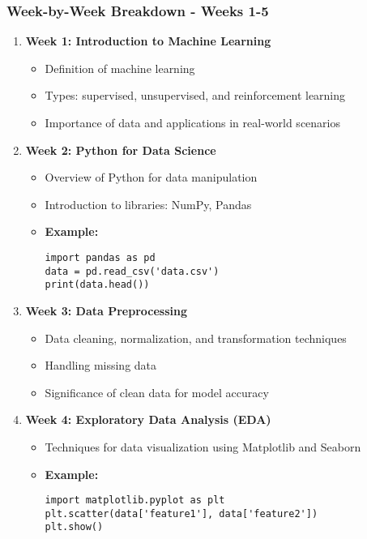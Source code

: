 \documentclass[aspectratio=169]{beamer}
\begin{document}
\begin{frame}
    \frametitle{Week-by-Week Breakdown - Weeks 1-5}
    \begin{enumerate}
        \item \textbf{Week 1: Introduction to Machine Learning}
            \begin{itemize}
                \item Definition of machine learning
                \item Types: supervised, unsupervised, and reinforcement learning
                \item Importance of data and applications in real-world scenarios
            \end{itemize}

        \item \textbf{Week 2: Python for Data Science}
            \begin{itemize}
                \item Overview of Python for data manipulation
                \item Introduction to libraries: NumPy, Pandas
                \item \textbf{Example:}
                \begin{lstlisting}
import pandas as pd
data = pd.read_csv('data.csv')
print(data.head())
                \end{lstlisting}
            \end{itemize}

        \item \textbf{Week 3: Data Preprocessing}
            \begin{itemize}
                \item Data cleaning, normalization, and transformation techniques
                \item Handling missing data
                \item Significance of clean data for model accuracy
            \end{itemize}

        \item \textbf{Week 4: Exploratory Data Analysis (EDA)}
            \begin{itemize}
                \item Techniques for data visualization using Matplotlib and Seaborn
                \item \textbf{Example:}
                \begin{lstlisting}
import matplotlib.pyplot as plt
plt.scatter(data['feature1'], data['feature2'])
plt.show()
                \end{lstlisting}
            \end{itemize}


\end{enumerate}
\end{frame}
\end{document}
